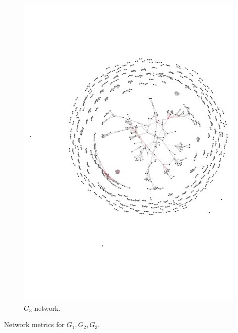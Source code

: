 \documentclass{article}
\theoremstyle{definition}
\begin{document}
\begin{figure}[!hbtp]
\begin{minipage}{.45\textwidth}
        \includegraphics[width=.9\textwidth]{./assets/anarchy_network.pdf}
        \caption{\(G_3\) network.}\label{fig:g_three}
    \end{minipage}
\end{figure}

\begin{table}[!hbtp]
    \centering
    \resizebox{\textwidth}{!}{
    }
    \caption{Network metrics for \(G_1, G_2, G_3\).}\label{table:summary_other_networks}
\end{table}
\end{document}
